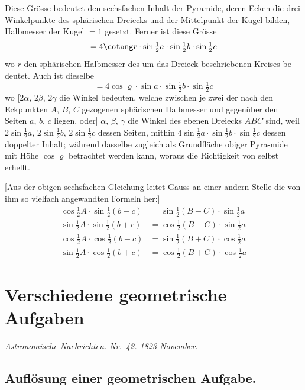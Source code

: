 \documentclass[12pt,a4paper]{article}
\begin{document}
Diese Gr\"osse bedeutet den sechsfachen Inhalt der Pyramide, deren Ecken die drei
Winkelpunkte des sph\"arischen Dreiecks und der Mittelpunkt der Kugel bilden,
Halbmesser der Kugel $=1$ gesetzt. Ferner ist diese Gr\"osse
\[
= 4\cotang r \cdot \sin\tfrac{1}{2}a \cdot \sin\tfrac{1}{2}b \cdot \sin\tfrac{1}{2}c
\]
wo $r$ den sph\"arischen Halbmesser des um das Dreieck beschriebenen Kreises be-\/deutet. Auch ist dieselbe
\[
= 4\cos\varrho \cdot \sin a \cdot \sin\tfrac{1}{2}b \cdot \sin\tfrac{1}{2}c
\]
wo $[2\alpha$, $2\beta$, $2\gamma$ die Winkel bedeuten, welche zwischen je zwei der nach den
Eckpunkten $A$, $B$, $C$ gezogenen sph\"arischen Halbmesser und gegen\"uber den
Seiten $a$, $b$, $c$ liegen, oder] $\alpha$, $\beta$, $\gamma$ die Winkel des ebenen Dreiecks $ABC$
sind, weil $2\sin\tfrac{1}{2}a$, $2\sin\tfrac{1}{2}b$, $2\sin\tfrac{1}{2}c$ dessen Seiten, mithin $4\sin\tfrac{1}{2}a \cdot \sin\tfrac{1}{2}b \cdot \sin\tfrac{1}{2}c$
dessen doppelter Inhalt; w\"ahrend dasselbe zugleich als Grundfl\"ache obiger Pyra-\/mide mit H\"ohe $\cos\varrho$ betrachtet werden kann, woraus die Richtigkeit von selbst
erhellt.

[Aus der obigen sechsfachen Gleichung leitet Gauss an einer andern
Stelle die von ihm so vielfach angewandten Formeln her:]
\begin{align*}
\cos\tfrac{1}{2}A \cdot \sin\tfrac{1}{2}(b-c) &= \sin\tfrac{1}{2}(B-C) \cdot \sin\tfrac{1}{2}a \\
\sin\tfrac{1}{2}A \cdot \sin\tfrac{1}{2}(b+c) &= \cos\tfrac{1}{2}(B-C) \cdot \sin\tfrac{1}{2}a \\
\cos\tfrac{1}{2}A \cdot \cos\tfrac{1}{2}(b-c) &= \sin\tfrac{1}{2}(B+C) \cdot \cos\tfrac{1}{2}a \\
\sin\tfrac{1}{2}A \cdot \cos\tfrac{1}{2}(b+c) &= \cos\tfrac{1}{2}(B+C) \cdot \cos\tfrac{1}{2}a
\end{align*}

\newpage
\section*{Verschiedene geometrische Aufgaben}

\begin{center}
\textit{Astronomische Nachrichten. Nr.~42. 1823 November.}
\end{center}

\subsection*{Aufl\"osung einer geometrischen Aufgabe.}
\end{document}
